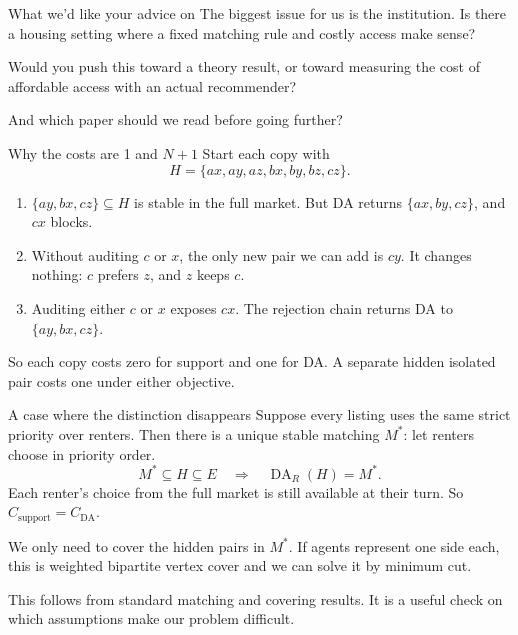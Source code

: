 \documentclass[aspectratio=169,14pt]{beamer}
\newif\ifbackup
\newcommand{\DA}{\operatorname{DA}}
\newcommand{\supp}{C_{\mathrm{support}}}
\newcommand{\resp}{C_{\mathrm{DA}}}
\newcommand{\sources}[1]{\vfill{\fontsize{9}{11}\selectfont\color{muted}#1\par}}
\begin{document}
\begin{frame}[t]{What we'd like your advice on}
\small
The biggest issue for us is the institution. Is there a housing setting
where a fixed matching rule and costly access make sense?

\bigskip
Would you push this toward a theory result, or toward measuring the
cost of affordable access with an actual recommender?

\bigskip
And which paper should we read before going further?
\end{frame}

\backuptrue

\begin{frame}[t]{Why the costs are 1 and \texorpdfstring{$N+1$}{N+1}}
\small
\setlength{\parskip}{1pt}
Start each copy with
\[
 H=\{ax,ay,az,bx,by,bz,cz\}.
\]
\begin{enumerate}
\setlength{\itemsep}{4pt}
\item $\{ay,bx,cz\}\subseteq H$ is stable in the full market.
But DA returns $\{ax,by,cz\}$, and $cx$ blocks.
\item Without auditing $c$ or $x$, the only new pair we can add is $cy$.
It changes nothing: $c$ prefers $z$, and $z$ keeps $c$.
\item Auditing either $c$ or $x$ exposes $cx$. The rejection chain
returns DA to $\{ay,bx,cz\}$.
\end{enumerate}
So each copy costs zero for support and one for DA. A separate hidden
isolated pair costs one under either objective.
\end{frame}

\begin{frame}[t]{A case where the distinction disappears}
\small
Suppose every listing uses the same strict priority over renters.
Then there is a unique stable matching $M^*$: let renters choose in
priority order.
\[
 M^*\subseteq H\subseteq E
 \quad\Longrightarrow\quad
 \DA_R(H)=M^*.
\]
Each renter's choice from the full market is still available at their turn.
So $\supp=\resp$.

\medskip
We only need to cover the hidden pairs in $M^*$. If agents represent
one side each, this is weighted bipartite vertex cover and we can solve
it by minimum cut.
\sources{This follows from standard matching and covering results.
It is a useful check on which assumptions make our problem difficult.}
\end{frame}
\end{document}
